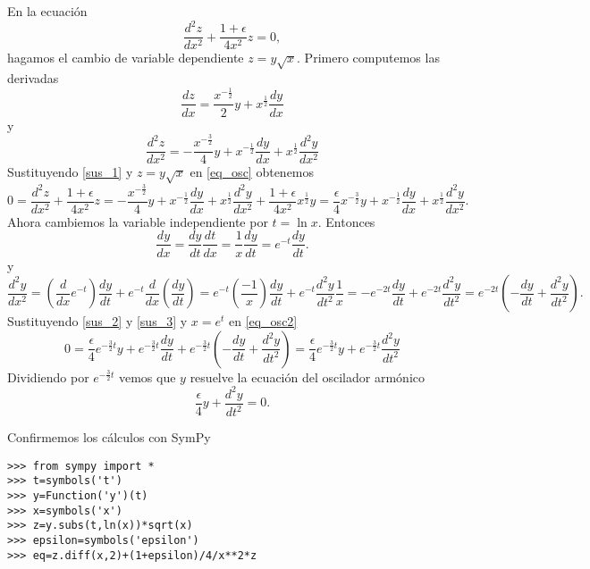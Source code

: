 \begin{demo} En la ecuación 
\begin{equation}\label{eq_osc}\frac{d^2z}{dx^2}+\frac{1+\epsilon}{4x^2}z=0,
\end{equation}
hagamos el cambio de variable dependiente $z=y\sqrt{x}$. Primero computemos las derivadas
\[
\frac{dz}{dx}=\frac{x^{-\frac{1}{2}}}{2}y+x^{\frac{1}{2}}\frac{dy}{dx}
\]
y
\begin{equation}\label{sus_1}
\frac{d^2z}{dx^2}=-\frac{x^{-\frac{3}{2}}}{4}y+ x^{-\frac{1}{2}}\frac{dy}{dx} +x^{\frac{1}{2}}\frac{d^2y}{dx^2}
\end{equation}
Sustituyendo \eqref{sus_1} y  $z=y\sqrt{x}$ en \eqref{eq_osc} obtenemos
\begin{equation}\label{eq_osc2}
0=\frac{d^2z}{dx^2}+\frac{1+\epsilon}{4x^2}z=-\frac{x^{-\frac{3}{2}}}{4}y+ 
x^{-\frac{1}{2}}\frac{dy}{dx} +x^{\frac{1}{2}}\frac{d^2y}{dx^2}+\frac{1+\epsilon}{4x^2}
x^{\frac{1}{2}}y=\boxed{\frac{\epsilon}{4}x^{-\frac{3}{2}}y+ x^{-\frac{1}{2}}\frac{dy}{dx} +x^{\frac{1}{2}}\frac{d^2y}{dx^2}}.
\end{equation}
Ahora cambiemos la variable independiente por $t=\ln x$. Entonces
\begin{equation}\label{sus_2}\frac{dy}{dx}=\frac{dy}{dt}\frac{dt}{dx}=\frac{1}{x}\frac{dy}{dt}=\boxed{
e^{-t}\frac{dy}{dt}}.
\end{equation}
y
\begin{equation}\label{sus_3}\frac{d^2y}{dx^2}=\left(\frac{d}{dx}e^{-t}\right)\frac{dy}{dt}+
e^{-t}\frac{d}{dx}\left(\frac{dy}{dt}\right)=e^{-t}\left(\frac{-1}{x}\right)\frac{dy}{dt}+
e^{-t}\frac{d^2y}{dt^2}\frac{1}{x}=-e^{-2t}\frac{dy}{dt}+
e^{-2t}\frac{d^2y}{dt^2}=\boxed{e^{-2t}\left(-\frac{dy}{dt}+
\frac{d^2y}{dt^2}\right)}.
\end{equation}
Sustituyendo \eqref{sus_2} y \eqref{sus_3} y $x=e^t$ en \eqref{eq_osc2}
\[
0=\frac{\epsilon}{4}e^{-\frac{3}{2}t}y+e^{-\frac{3}{2}t}\frac{dy}{dt}+e^{-\frac{3}{2}t}\left(-\frac{dy}{dt}+
\frac{d^2y}{dt^2}\right)=\frac{\epsilon}{4}e^{-\frac{3}{2}t}y+e^{-\frac{3}{2}t}\frac{d^2y}{dt^2}
\]
Dividiendo por $e^{-\frac{3}{2}t}$ vemos que $y$ resuelve la ecuación del oscilador armónico
\begin{equation}\label{osc_fin}
\boxed{\frac{\epsilon}{4}y+\frac{d^2y}{dt^2}=0}.
\end{equation}

Confirmemos los cálculos con SymPy
\begin{lstlisting}
>>> from sympy import *
>>> t=symbols('t') 
>>> y=Function('y')(t)
>>> x=symbols('x') 
>>> z=y.subs(t,ln(x))*sqrt(x)
>>> epsilon=symbols('epsilon')
>>> eq=z.diff(x,2)+(1+epsilon)/4/x**2*z
\end{lstlisting}


\end{demo}

